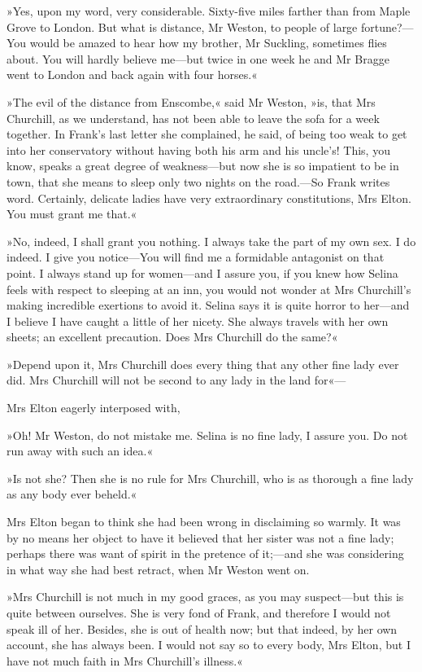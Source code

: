»Yes, upon my word, very considerable. Sixty-five miles farther than from Maple Grove to London. But what is distance, Mr Weston, to people of large fortune?—You would be amazed to hear how my brother, Mr Suckling, sometimes flies about. You will hardly believe me—but twice in one week he and Mr Bragge went to London and back again with four horses.«

»The evil of the distance from Enscombe,« said Mr Weston, »is, that Mrs Churchill, as we understand, has not been able to leave the sofa for a week together. In Frank's last letter she complained, he said, of being too weak to get into her conservatory without having both his arm and his uncle's! This, you know, speaks a great degree of weakness—but now she is so impatient to be in town, that she means to sleep only two nights on the road.—So Frank writes word. Certainly, delicate ladies have very extraordinary constitutions, Mrs Elton. You must grant me that.«

»No, indeed, I shall grant you nothing. I always take the part of my own sex. I do indeed. I give you notice—You will find me a formidable antagonist on that point. I always stand up for women—and I assure you, if you knew how Selina feels with respect to sleeping at an inn, you would not wonder at Mrs Churchill's making incredible exertions to avoid it. Selina says it is quite horror to her—and I believe I have caught a little of her nicety. She always travels with her own sheets; an excellent precaution. Does Mrs Churchill do the same?«

»Depend upon it, Mrs Churchill does every thing that any other fine lady ever did. Mrs Churchill will not be second to any lady in the land for«—

Mrs Elton eagerly interposed with,

»Oh! Mr Weston, do not mistake me. Selina is no fine lady, I assure you. Do not run away with such an idea.«

»Is not she? Then she is no rule for Mrs Churchill, who is as thorough a fine lady as any body ever beheld.«

Mrs Elton began to think she had been wrong in disclaiming so warmly. It was by no means her object to have it believed that her sister was not a fine lady; perhaps there was want of spirit in the pretence of it;—and she was considering in what way she had best retract, when Mr Weston went on.

»Mrs Churchill is not much in my good graces, as you may suspect—but this is quite between ourselves. She is very fond of Frank, and therefore I would not speak ill of her. Besides, she is out of health now; but that indeed, by her own account, she has always been. I would not say so to every body, Mrs Elton, but I have not much faith in Mrs Churchill's illness.«


